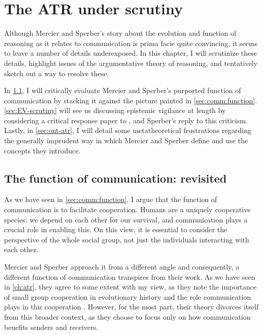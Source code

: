 \chapter{The ATR under scrutiny}
\label{ch:scrutiny}

Although Mercier and Sperber's story about the evolution and function of reasoning as it relates to communication is prima facie quite convincing, it seems to leave a number of details underexposed. In this chapter, I will scrutinize these details, highlight issues of the argumentative theory of reasoning, and tentatively sketch out a way to resolve these.

In \cref{sec:comm-func-scrutiny}, I will critically evaluate Mercier and Sperber's purported function of communication by stacking it against the picture painted in \cref{sec:comm:function}.
\cref{sec:EV-scrutiny} will see us discussing epistemic vigilance at length by considering a critical response paper to \citet{Sperber10}, and Sperber's reply to this criticism.
Lastly, in \cref{sec:ont-atr}, I will detail some metatheoretical frustrations regarding the generally imprudent way in which Mercier and Sperber define and use the concepts they introduce.

\section{The function of communication: revisited}
\label{sec:comm-func-scrutiny}

As we have seen in \cref{sec:comm:function}, I argue that the function of communication is to facilitate cooperation. Humans are a uniquely cooperative species: we depend on each other for our survival, and communication plays a crucial role in enabling this. On this view, it is essential to consider the perspective of the whole social group, not just the individuals interacting with each other.

Mercier and Sperber approach it from a different angle and consequently, a different function of communication transpires from their work.
As we have seen in \cref{ch:atr}, they agree to some extent with my view, as they note the importance of small group cooperation in evolutionary history and the role communication plays in this cooperation \citep[p.~60]{MS11}.
However, for the most part, their theory divorces itself from this broader context, as they choose to focus only on how communication benefits senders and receivers.

